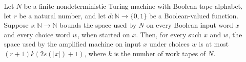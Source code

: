 \begin{theorem}
\label{Randomized.Amplify.amp_usesSpace}
\leanok
{}
Let $N$ be a finite nondeterministic Turing machine with Boolean tape alphabet, let $r$
be a natural number, and let $d:\mathbb{N}\to\{0,1\}$ be a Boolean-valued function.
Suppose $s:\mathbb{N}\to\mathbb{N}$ bounds the space used by $N$ on every Boolean input
word $x$ and every choice word $w$, when started on $x$. Then, for every such $x$ and
$w$, the space used by the amplified machine on input $x$ under choices $w$ is at most
$(r+1)k(2s(|x|)+1)$, where $k$ is the number of work tapes of $N$.
\end{theorem}
